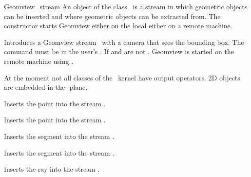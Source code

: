 \begin{ccClass}{Geomview_stream}
\ccDefinition
An object of the class \ccClassName\ is a stream in which geometric
objects can be inserted and where geometric objects can be extracted
from. The constructor starts Geomview either on the local either on
a remote machine.


\ccThreeToTwo
\ccCreation
{}

{Introduces a Geomview stream \ccVar\ with a camera that sees the
bounding box.  The command  must be in the user's .
If  and  are not ,
Geomview is started on the remote machine using .}

\ccOperations



\def\ccTagRmEigenClassName{\ccFalse}

At the moment not all classes of the \cgal\ kernel have output
operators. 2D objects are embedded in the -plane.

{Inserts the point  into the stream \ccVar.}

\newpage
{}
{Inserts the point  into the stream \ccVar.}


{Inserts the segment  into the stream \ccVar.}

{Inserts the segment  into the stream \ccVar.}


{Inserts the ray  into the stream \ccVar.}


\end{ccClass}
